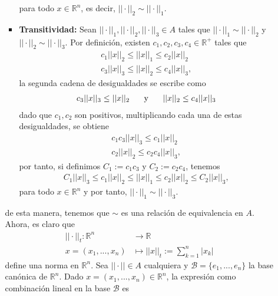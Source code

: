\begin{itemize}[leftmargin=*]
\begin{solution}
\begin{enumerate}[(a)]
\begin{itemize}
                    para todo $x \in \mathbb{R}^n$, es decir, $||\cdot||_2\sim ||\cdot||_1$.
                    \item \textbf{Transitividad:} Sean $||\cdot||_1,||\cdot||_2,||\cdot||_3 \in A$ tales que $||\cdot||_1\sim ||\cdot||_2$ y $||\cdot||_2\sim ||\cdot||_3$. Por definición, existen $c_1,c_2,c_3,c_4 \in \mathbb{R}^+$ tales que
                    \begin{align*}
                        c_1||x||_2\leq ||x||_1\leq c_2 ||x||_2\\
                        c_3||x||_3\leq ||x||_2\leq c_4||x||_3,
                    \end{align*}
                    la segunda cadena de desigualdades se escribe como
                    \begin{align*}
                        c_3||x||_3\leq ||x||_2 \hspace{5mm} \text{ y } \hspace{5mm} ||x||_2\leq c_4||x||_3
                    \end{align*}
                    dado que $c_1,c_2$ son positivos, multiplicando cada una de estas desigualdades, se obtiene
                    \begin{align*}
                        c_1c_3||x||_3\leq c_1||x||_2\\
                        c_2||x||_2\leq c_2c_4||x||_3,
                    \end{align*}
                    por tanto, si definimos $C_1:=c_1c_3$ y $C_2:=c_2c_4$, tenemos
                    \begin{align*}
                        C_1||x||_3\leq c_1||x||_2\leq ||x||_1\leq c_2||x||_2\leq C_2||x||_3,
                    \end{align*}
                    para todo $x \in \mathbb{R}^n$ y por tanto, $||\cdot||_1\sim ||\cdot||_3$.
                \end{itemize}
                de esta manera, tenemos que $\sim$ es una relación de equivalencia en $A$. Ahora, es claro que 
                \begin{align*}
                    ||\cdot||_t:\mathbb{R}^n&\longrightarrow \mathbb{R}\\
                    x=(x_1,...,x_n)&\longmapsto ||x||_t:=\sum_{k=1}^n|x_k|
                \end{align*}
                define una norma en $\mathbb{R}^n$. Sea $||\cdot||\in A$ cualquiera y $\mathcal{B}=\{e_1,...,e_n\}$ la base canónica de $\mathbb{R}^n$. Dado $x=(x_1,...,x_n) \in \mathbb{R}^n$, la expresión como combinación lineal en la base $\mathcal{B}$ es 

\end{enumerate}
\end{solution}
\end{itemize}
